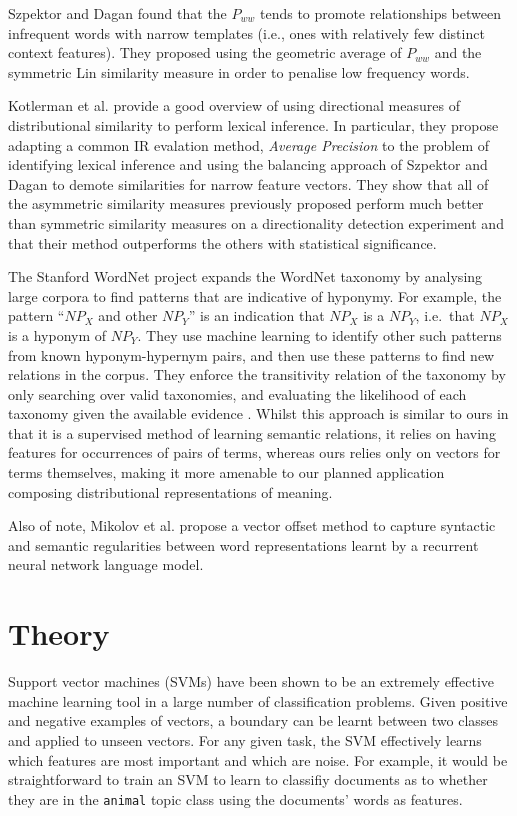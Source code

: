 \documentclass[11pt]{article}
\begin{document}
Szpektor and Dagan  found that the $P_{ww}$ tends to promote relationships between infrequent words with narrow templates (i.e., ones with relatively few distinct context features).  They proposed using the geometric average of $P_{ww}$ and the symmetric Lin similarity measure in order to penalise low frequency words.   

Kotlerman et al.  provide a good overview of using directional measures of distributional similarity to perform lexical inference.  In particular, they propose adapting a common IR evalation method, \emph{Average Precision} to the problem of identifying lexical inference and using the balancing approach of Szpektor and Dagan  to demote similarities for narrow feature vectors.  They show that all of the asymmetric similarity measures previously proposed perform much better than symmetric similarity measures on a directionality detection experiment and that their method outperforms the others with statistical significance.

The Stanford WordNet project \cite{Snow:04} expands the WordNet
taxonomy by analysing large corpora to find patterns that are
indicative of hyponymy. For example, the pattern ``$\mathit{NP}_X$ and
other $\mathit{NP}_Y$'' is an indication that $\mathit{NP}_X$ is a
$\mathit{NP}_Y$, i.e.~that $\mathit{NP}_X$ is a hyponym of
$\mathit{NP}_Y$. They use machine learning to identify other such
patterns from known hyponym-hypernym pairs, and then use these
patterns to find new relations in the corpus. They enforce the
transitivity relation of the taxonomy by only searching over valid
taxonomies, and evaluating the likelihood of each taxonomy given the
available evidence \cite{Snow:06}. Whilst this approach is similar to
ours in that it is a supervised method of learning semantic relations,
it relies on having features for occurrences of pairs of terms,
whereas ours relies only on vectors for terms themselves, making it
more amenable to our planned application composing distributional
representations of meaning.

Also of note, Mikolov et al.  propose a vector offset method to capture syntactic and semantic regularities between word representations learnt by a recurrent neural network language model.

\section{Theory}
\label{sect:theory}
Support vector machines (SVMs) have been shown to be an extremely effective machine learning tool in a large number of classification problems.  Given positive and negative examples of vectors, a boundary can be learnt between two classes and applied to unseen vectors.  For any given task, the SVM effectively learns which features are most important and which are noise.  For example, it would be straightforward to train an SVM to learn to classifiy documents as to whether they are in the \texttt{animal} topic class using the documents' words as features.     
\end{document}
